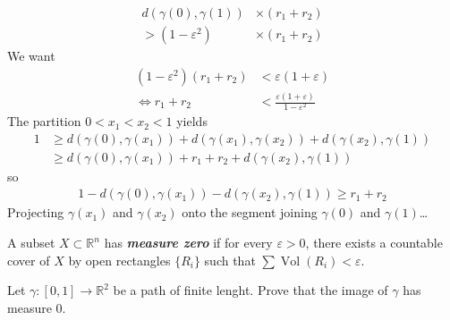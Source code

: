 \documentclass{article}
\newcommand{\R}{\mathbb{R}}
\DeclareMathOperator{\Vol}{Vol}
\begin{document}
	\begin{align*}
		d(\gamma(0),\gamma(1))&\times (r_1+r_2)\\
		>(1-\varepsilon^2)&\times (r_1+r_2)
	\end{align*}
	We want
	\begin{align*}
		(1-\varepsilon^2)(r_1+r_2)&<\varepsilon(1+\varepsilon)\\
		\iff r_1+r_2&<\frac{\varepsilon(1+\varepsilon)}{1-\varepsilon^2}
	\end{align*}
	The partition $0<x_1<x_2<1$ yields
	\begin{align*}
		1&\geq d(\gamma(0),\gamma(x_1))+d(\gamma(x_1),\gamma(x_2))+d(\gamma(x_2),\gamma(1))\\
		&\geq d(\gamma(0),\gamma(x_1))+r_1+r_2+d(\gamma(x_2),\gamma(1))
	\end{align*}
	so
	\begin{align*}
		1-d(\gamma(0),\gamma(x_1))-d(\gamma(x_2),\gamma(1))\geq r_1+r_2
	\end{align*}
	Projecting $\gamma(x_1)$ and $\gamma(x_2)$ onto the segment joining $\gamma(0)$ and $\gamma(1)$…

\begin{defn}
	A subset $X\subset \R^n$ has \textbf{\textit{measure zero}} if for every $\varepsilon > 0$, there exists a countable cover of $X$ by open rectangles $\{R_i\}$ such that $\sum\Vol(R_i)<\varepsilon$.
\end{defn}
\begin{exercise}
	Let $\gamma:[0,1]\to\R^2$ be a path of finite lenght. Prove that the image of $\gamma$ has measure 0.
\end{exercise}
\end{document}

